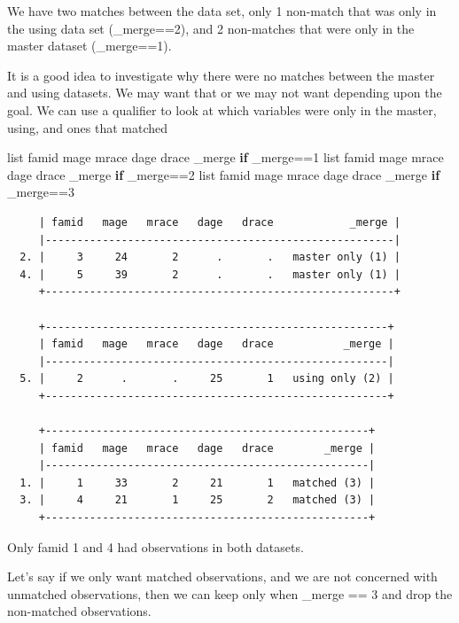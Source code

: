 \documentclass[
]{book}
\newenvironment{Shaded}{\begin{snugshade}}{\end{snugshade}}
\newcommand{\DataTypeTok}[1]{\textcolor[rgb]{0.13,0.29,0.53}{#1}}
\newcommand{\KeywordTok}[1]{\textcolor[rgb]{0.13,0.29,0.53}{\textbf{#1}}}
\newcommand{\NormalTok}[1]{#1}
\newcommand{\OtherTok}[1]{\textcolor[rgb]{0.56,0.35,0.01}{#1}}
\begin{document}
We have two matches between the data set, only 1 non-match that was only in the using data set (\_merge==2), and 2 non-matches that were only in the master dataset (\_merge==1).

It is a good idea to investigate why there were no matches between the master and using datasets. We may want that or we may not want depending upon the goal. We can use a qualifier to look at which variables were only in the master, using, and ones that matched

\begin{Shaded}
\begin{Highlighting}[]
\OtherTok{list}\NormalTok{ famid mage mrace dage drace }\DataTypeTok{\_merge} \KeywordTok{if} \DataTypeTok{\_merge}\NormalTok{==1}
\OtherTok{list}\NormalTok{ famid mage mrace dage drace }\DataTypeTok{\_merge} \KeywordTok{if} \DataTypeTok{\_merge}\NormalTok{==2}
\OtherTok{list}\NormalTok{ famid mage mrace dage drace }\DataTypeTok{\_merge} \KeywordTok{if} \DataTypeTok{\_merge}\NormalTok{==3}
\end{Highlighting}
\end{Shaded}

\begin{verbatim}
     | famid   mage   mrace   dage   drace            _merge |
     |-------------------------------------------------------|
  2. |     3     24       2      .       .   master only (1) |
  4. |     5     39       2      .       .   master only (1) |
     +-------------------------------------------------------+

     +------------------------------------------------------+
     | famid   mage   mrace   dage   drace           _merge |
     |------------------------------------------------------|
  5. |     2      .       .     25       1   using only (2) |
     +------------------------------------------------------+

     +---------------------------------------------------+
     | famid   mage   mrace   dage   drace        _merge |
     |---------------------------------------------------|
  1. |     1     33       2     21       1   matched (3) |
  3. |     4     21       1     25       2   matched (3) |
     +---------------------------------------------------+
\end{verbatim}

Only famid 1 and 4 had observations in both datasets.

Let's say if we only want matched observations, and we are not concerned with unmatched observations, then we can keep only when \_merge == 3 and drop the non-matched observations.
\end{document}
